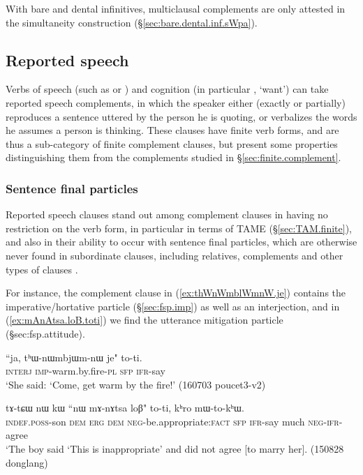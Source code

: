 With bare and dental infinitives, multiclausal complements are only attested in the simultaneity construction (§\ref{sec:bare.dental.inf.sWpa}).

\subsection{Reported speech} \label{sec:reported.speech}
Verbs of speech (such as  or ) and cognition (in particular , `want') can take reported speech complements, in which the speaker either (exactly or partially) reproduces a sentence uttered by the person he is quoting, or verbalizes the words he assumes a person is thinking. These clauses have finite verb forms, and are thus a sub-category of finite complement clauses, but present some properties distinguishing them from the complements studied in §\ref{sec:finite.complement}.

\subsubsection{Sentence final particles} \label{sec:reported.speech.sfp}
Reported speech clauses stand out among complement clauses in having no restriction on the verb form, in particular in terms of TAME (§\ref{sec:TAM.finite}), and also in their ability to occur with sentence final particles, which are otherwise never found in subordinate clauses, including relatives, complements and other types of clauses . 

For instance, the complement clause in (\ref{ex:thWnWmblWmnW.je}) contains the imperative/hortative particle  (§\ref{sec:fsp.imp}) as well as an interjection, and in (\ref{ex:mAnAtsa.loB.toti}) we find the utterance mitigation particle  (§{sec:fsp.attitude}).   

 \begin{exe}
\ex \label{ex:thWnWmblWmnW.je}
 \gll ``ja, tʰɯ-nɯmbjɯm-nɯ je" to-ti. \\
 \textsc{interj} \textsc{imp}-warm.by.fire-\textsc{pl} \textsc{sfp} \textsc{ifr}-say \\
 \glt `She said: `Come, get warm by the fire!' (160703 poucet3-v2)
 \end{exe} 
 
 \begin{exe}
\ex \label{ex:mAnAtsa.loB.toti}
 \gll tɤ-tɕɯ nɯ kɯ ``nɯ mɤ-nɤtsa loβ" to-ti, kʰro mɯ-to-kʰɯ. \\
 \textsc{indef}.\textsc{poss}-son \textsc{dem} \textsc{erg} \textsc{dem} \textsc{neg}-be.appropriate:\textsc{fact} \textsc{sfp} \textsc{ifr}-say much \textsc{neg}-\textsc{ifr}-agree \\
 \glt `The boy said `This is inappropriate' and did not agree [to marry her]. (150828 donglang)
\end{exe} 
  
